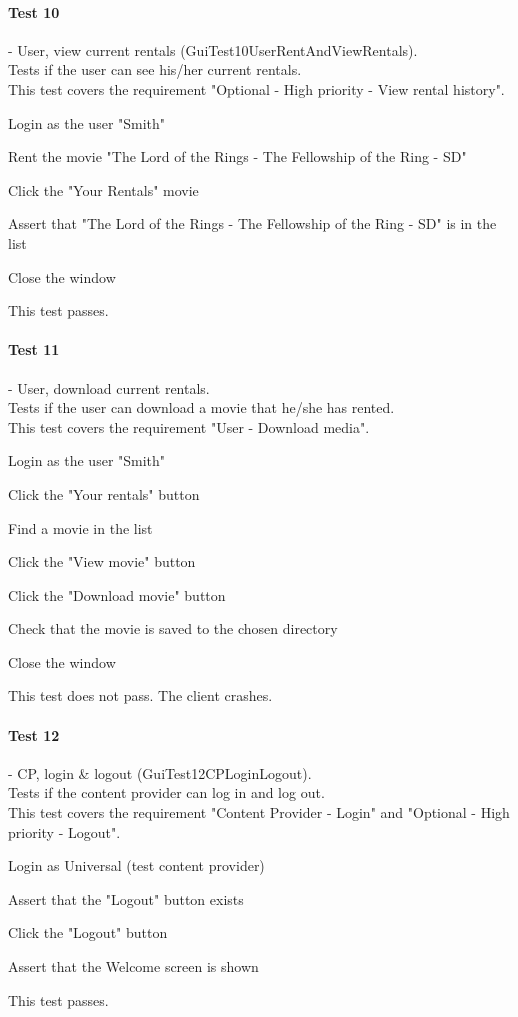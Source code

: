 \paragraph{Test 10} - User, view current rentals (GuiTest10UserRentAndViewRentals). \\
Tests if the user can see his/her current rentals. \\
This test covers the requirement "Optional - High priority - View rental history".
\begin{my_enumerate}
\item Login as the user "Smith"
\item Rent the movie "The Lord of the Rings - The Fellowship of the Ring - SD"
\item Click the "Your Rentals" movie
\item Assert that "The Lord of the Rings - The Fellowship of the Ring - SD" is in the list
\item Close the window
\end{my_enumerate}
This test passes.

\paragraph{Test 11} - User, download current rentals. \\
Tests if the user can download a movie that he/she has rented. \\
This test covers the requirement "User - Download media".
\begin{my_enumerate}
\item Login as the user "Smith"
\item Click the "Your rentals" button
\item Find a movie in the list
\item Click the "View movie" button
\item Click the "Download movie" button
\item Check that the movie is saved to the chosen directory
\item Close the window
\end{my_enumerate}
This test does not pass. The client crashes.

\paragraph{Test 12} - CP, login \& logout (GuiTest12CPLoginLogout). \\
Tests if the content provider can log in and log out. \\
This test covers the requirement "Content Provider - Login" and "Optional - High priority - Logout".
\begin{my_enumerate}
\item Login as Universal (test content provider)
\item Assert that the "Logout" button exists
\item Click the "Logout" button
\item Assert that the Welcome screen is shown
\end{my_enumerate}
This test passes.

